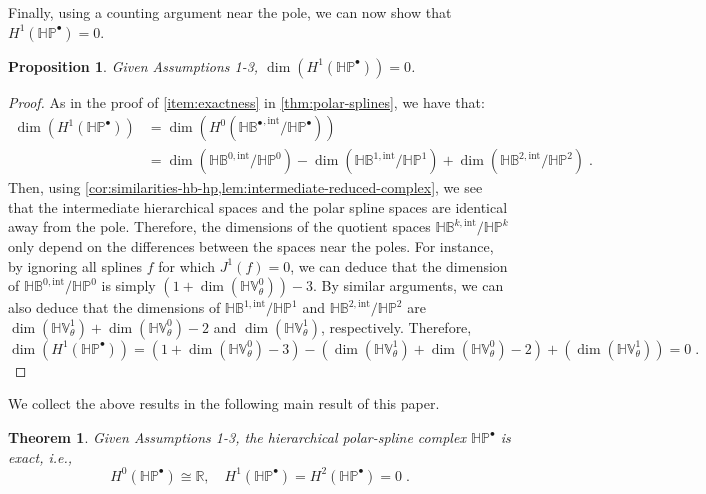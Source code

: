 \documentclass[10pt]{article}
\newcommand{\RR}{{\mathbb{R}}}
\newcommand{\dimwp}[1]{\dim{\left(#1\right)}}
\newcommand{\isomorphic}{\cong}
\newcommand{\vSpace}[1]{\mathbb{#1}}
\newcommand{\complex}[1]{\mathit{\vSpace{#1}^\bullet}}
\newcommand{\cU}{\theta}
\newcommand{\bsp}{B}
\newcommand{\polar}{P}
\newcommand{\jet}[2]{J^{#1}\left(#2\right)}
\newcommand{\tint}{\mathrm{int}}
\newcommand{\hSpace}[1]{\mathit{\vSpace{H}\vSpace{#1}}}
\newcommand{\hintComplex}{\complex{H\bsp}^{,\tint}}
\newcommand{\hpolarComplex}{\complex{H\polar}}
\theoremstyle{plain}
\newtheorem{theorem}{Theorem}[section]
\newtheorem{proposition}{Proposition}[section]
\theoremstyle{definition}
\theoremstyle{remark}
\begin{document}
Finally, using a counting argument near the pole, we can now show that $H^1(\hpolarComplex) = 0$.
\begin{proposition}
    Given Assumptions 1-3, $\dimwp{H^1(\hpolarComplex)} = 0$.
\end{proposition}
\begin{proof}
    As in the proof of \cref{item:exactness} in \cref{thm:polar-splines}, we have that:
    \begin{equation*}
        \begin{split}
            \dimwp{H^1(\hpolarComplex)} &= \dimwp{H^0(\hintComplex/\hpolarComplex)}\;\\
            &= \dimwp{\hSpace{\bsp}^{0,\tint}/\hSpace{\polar}^0} - \dimwp{\hSpace{\bsp}^{1,\tint}/\hSpace{\polar}^1} + \dimwp{\hSpace{\bsp}^{2,\tint}/\hSpace{\polar}^2}\;.
        \end{split}
    \end{equation*}
    Then, using \cref{cor:similarities-hb-hp,lem:intermediate-reduced-complex}, we see that the intermediate hierarchical spaces and the polar spline spaces are identical away from the pole.
    Therefore, the dimensions of the quotient spaces $\hSpace{\bsp}^{k,\tint}/\hSpace{\polar}^k$ only depend on the differences between the spaces near the poles.
    For instance, by ignoring all splines $f$ for which $\jet{1}{f} = 0$, we can deduce that the dimension of $\hSpace{\bsp}^{0,\tint}/\hSpace{\polar}^0$ is simply $(1 + \dimwp{\hSpace{V}_\cU^0}) - 3$.
    By similar arguments, we can also deduce that the dimensions of $\hSpace{\bsp}^{1,\tint}/\hSpace{\polar}^1$ and $\hSpace{\bsp}^{2,\tint}/\hSpace{\polar}^2$ are $\dimwp{\hSpace{V}_\cU^1} + \dimwp{\hSpace{V}_\cU^0} - 2$ and $\dimwp{\hSpace{V}_\cU^1}$, respectively.
    Therefore,
    \begin{equation*}
        \dimwp{H^1(\hpolarComplex)} =
        \left( 1 + \dimwp{\hSpace{V}_\cU^0} - 3 \right)
        - \left( \dimwp{\hSpace{V}_\cU^1} + \dimwp{\hSpace{V}_\cU^0} - 2 \right)
        + \left( \dimwp{\hSpace{V}_\cU^1} \right) = 0\;.
    \end{equation*}
\end{proof}

We collect the above results in the following main result of this paper.
\begin{theorem}\label{thm:exactness}
    Given Assumptions 1-3, the hierarchical polar-spline complex $\hpolarComplex$ is exact, i.e.,
    \begin{equation*}
        H^0(\hpolarComplex) \isomorphic \RR, \quad H^1(\hpolarComplex) = H^2(\hpolarComplex) = 0\;.
    \end{equation*}
\end{theorem}
\end{document}
